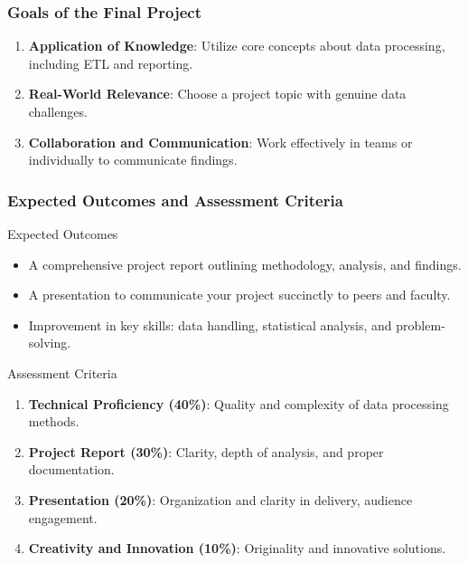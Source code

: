 \documentclass[aspectratio=169]{beamer}
\begin{document}
\begin{frame}[fragile]
    \frametitle{Goals of the Final Project}
    \begin{enumerate}
        \item \textbf{Application of Knowledge}: Utilize core concepts about data processing, including ETL and reporting.
        \item \textbf{Real-World Relevance}: Choose a project topic with genuine data challenges.
        \item \textbf{Collaboration and Communication}: Work effectively in teams or individually to communicate findings.
    \end{enumerate}
\end{frame}

\begin{frame}[fragile]
    \frametitle{Expected Outcomes and Assessment Criteria}
    
    \begin{block}{Expected Outcomes}
        \begin{itemize}
            \item A comprehensive project report outlining methodology, analysis, and findings.
            \item A presentation to communicate your project succinctly to peers and faculty.
            \item Improvement in key skills: data handling, statistical analysis, and problem-solving.
        \end{itemize}
    \end{block}

    \begin{block}{Assessment Criteria}
        \begin{enumerate}
            \item \textbf{Technical Proficiency (40\%)}: Quality and complexity of data processing methods.
            \item \textbf{Project Report (30\%)}: Clarity, depth of analysis, and proper documentation.
            \item \textbf{Presentation (20\%)}: Organization and clarity in delivery, audience engagement.
            \item \textbf{Creativity and Innovation (10\%)}: Originality and innovative solutions.
        \end{enumerate}
    \end{block}
\end{frame}
\end{document}
